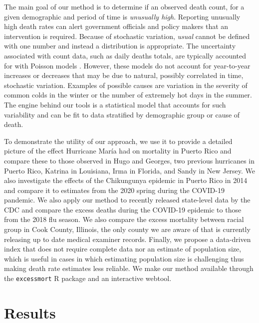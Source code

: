 \documentclass[11pt]{article}
\begin{document}
The main goal of our method is to determine if an observed death count, for a given demographic and period of time is \textit{unusually high}. Reporting unusually high death rates can alert government officials and policy makers that an intervention is required. Because of stochastic variation, \textit{usual} cannot be defined with one number and instead a distribution is appropriate. The uncertainty associated with count data, such as daily deaths totals, are typically accounted for with Poisson models \cite{mccullagh19831989, agresti2015foundations}. However, these models do not account for year-to-year increases or decreases that may be due to natural, possibly correlated in time, stochastic variation. Examples of possible causes are variation in the severity of common colds in the winter or the number of extremely hot days in the summer. The engine behind our tools is a statistical model that accounts for such variability and can be fit to data stratified by demographic group or cause of death. 

To demonstrate the utility of our approach, we use it to provide a detailed picture of the effect Hurricane Mar\'ia had on mortality in Puerto Rico and compare these to those observed in Hugo and Georges, two previous hurricanes in Puerto Rico, Katrina in Louisiana, Irma in Florida, and Sandy in New Jersey. We also investigate the effects of the Chikungunya epidemic in Puerto Rico in 2014 and compare it to estimates from the 2020 spring during the COVID-19 pandemic. We also apply our method to recently released state-level data by the CDC and compare the excess deaths during the COVID-19 epidemic to those from the 2018 flu season. We also compare the excess mortality between racial group in Cook County, Illinois, the only county we are aware of that is currently releasing up to date medical examiner records. Finally, we propose a data-driven index that does not require complete data nor an estimate of population size, which is useful in cases in which estimating population size is challenging thus making death rate estimates less reliable. We make our method available through the \verb+excessmort+ R package and an interactive webtool. \\

\section{Results}
\label{sec:results}
\end{document}
